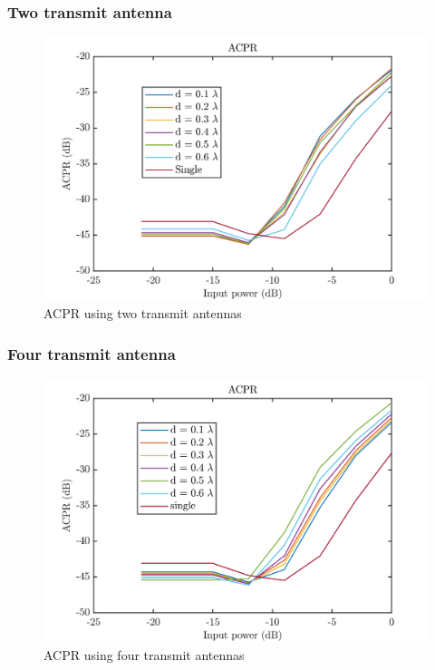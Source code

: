 \subsubsection{Two transmit antenna}

\begin{figure}[H]
\centering 
\includegraphics[scale = 1]{figures/measurement/two_antenna/ACPR.png}
\caption{ACPR using two transmit antennas}
\label{fig:acpr_meas1}
\end{figure} 

\subsubsection{Four transmit antenna}

\begin{figure}[H]
\centering 
\includegraphics[scale = 1]{figures/measurement/four_antenna/ACPR.png}
\caption{ACPR using four transmit antennas}
\label{fig:acpr_meas2}
\end{figure} 